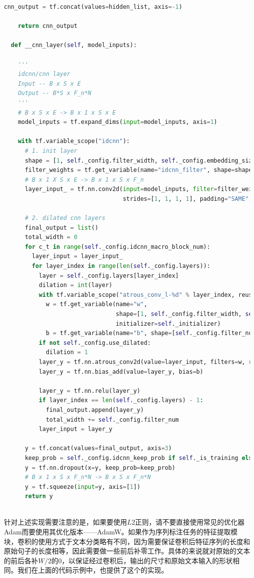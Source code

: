 \documentclass[twoside,a4paper,12pt]{book}%
\begin{document}
\begin{lstlisting}[language={python}]
    cnn_output = tf.concat(values=hidden_list, axis=-1)

    return cnn_output

  def __cnn_layer(self, model_inputs):

    '''
    idcnn/cnn layer
    Input -- B x S x E
    Output -- B*S x F_n*N
    '''
    # B x S x E -> B x 1 x S x E
    model_inputs = tf.expand_dims(input=model_inputs, axis=1)

    with tf.variable_scope("idcnn"):
      # 1. init layer
      shape = [1, self._config.filter_width, self._config.embedding_size, self._config.filter_num]
      filter_weights = tf.get_variable(name="idcnn_filter", shape=shape, initializer=self._initializer)
      # B x 1 X S x E -> B x 1 x S x F_n
      layer_input_ = tf.nn.conv2d(input=model_inputs, filter=filter_weights,
                                  strides=[1, 1, 1, 1], padding="SAME", name="init_layer")

      # 2. dilated cnn layers
      final_output = list()
      total_width = 0
      for c_t in range(self._config.idcnn_macro_block_num):
        layer_input = layer_input_
        for layer_index in range(len(self._config.layers)):
          layer = self._config.layers[layer_index]
          dilation = int(layer)
          with tf.variable_scope("atrous_conv_l-%d" % layer_index, reuse=tf.AUTO_REUSE):
            w = tf.get_variable(name="w",
                                shape=[1, self._config.filter_width, self._config.filter_num, self._config.filter_num],
                                initializer=self._initializer)
            b = tf.get_variable(name="b", shape=[self._config.filter_num])
          if not self._config.use_dilated:
            dilation = 1
          layer_y = tf.nn.atrous_conv2d(value=layer_input, filters=w, rate=dilation, padding="SAME")
          layer_y = tf.nn.bias_add(value=layer_y, bias=b)

          layer_y = tf.nn.relu(layer_y)
          if layer_index == len(self._config.layers) - 1:
            final_output.append(layer_y)
            total_width += self._config.filter_num
          layer_input = layer_y

      y = tf.concat(values=final_output, axis=3)
      keep_prob = self._config.idcnn_keep_prob if self._is_training else 1.0
      y = tf.nn.dropout(x=y, keep_prob=keep_prob)
      # B x 1 x S x F_n*N -> B x S x F_n*N
      y = tf.squeeze(input=y, axis=[1])
      return y
      
\end{lstlisting}
针对上述实现需要注意的是，如果要使用$L2$正则，请不要直接使用常见的优化器Adam而要使用其优化版本——AdamW。如果作为序列标注任务的特征提取模块，卷积的使用方式于文本分类略有不同，因为需要保证卷积后特征序列的长度和原始句子的长度相等，因此需要做一些前后补零工作。具体的来说就对原始的文本的前后各补$W/2$的$0$，以保证经过卷积后，输出的尺寸和原始文本输入的形状相同。我们在上面的代码示例中，也提供了这个的实现。
\end{document}
